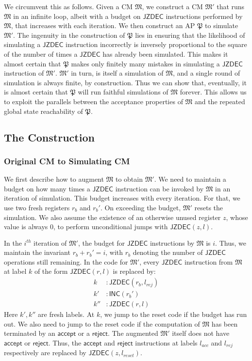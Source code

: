 \documentclass{article}
\theoremstyle{remark}
\newcommand{\program}{\mathfrak{P}}
\newcommand{\machine}{\mathfrak{M}}
\newcommand{\inc}{\mathsf{INC}}
\newcommand{\jzdec}{\mathsf{JZDEC}}
\newcommand{\accept}{\mathsf{accept}}
\newcommand{\reject}{\mathsf{reject}}
\begin{document}
We circumvent this as follows. Given a CM $\machine$, we construct a CM $\machine'$ that runs $\machine$ in an infinite loop, albeit with a budget on $\jzdec$ instructions performed by $\machine$, that increases with each iteration. We then construct an AP $\program$ to simulate $\machine'$. The ingenuity in the construction of $\program$ lies in ensuring that the likelihood of simulating a $\jzdec$ instruction incorrectly is inversely proportional to the square of the number of times a $\jzdec$ has already been simulated. This makes it almost certain that $\program$ makes only finitely many mistakes in simulating a $\jzdec$ instruction of $\machine'$. $\machine'$ in turn, is itself a simulation of $\machine$, and a single round of simulation is always finite, by construction. Thus we can show that, eventually, it is almost certain that $\program$ will run faithful simulations of $\machine$ forever. This allows us to exploit the parallels between the acceptance properties of $\machine$ and the repeated global state reachability of $\program$.

\subsection{The Construction}
\subsubsection{Original CM to Simulating CM}
We first describe how to augment $\machine$ to obtain $\machine'$. We need to maintain a budget on how many times a $\jzdec$ instruction can be invoked by $\machine$ in an iteration of simulation. This budget increases with every iteration. For that, we use two fresh registers $r_b$ and $r_b'$. On exceeding the budget, $\machine'$ resets the simulation. We also assume the existence of an otherwise unused register $z$, whose value is always $0$, to perform unconditional jumps with $\jzdec(z, l)$.

In the $i^{th}$ iteration of $\machine'$, the budget for $\jzdec$ instructions by $\machine$ is $i$. Thus, we maintain the invariant $r_b + r_b' = i$, with $r_b$ denoting the number of $\jzdec$ operations still remaining. In the code for $\machine'$, every $\jzdec$ instruction from $\machine$ at label $k$ of the form $\jzdec(r, l)$ is replaced by:
\begin{align*}
k &: \jzdec(r_b, l_{rej}) \\
k' &: \inc(r_b') \\
k'' &: \jzdec(r, l)
\end{align*} 
Here $k', k''$ are fresh labels. At $k$, we jump to the reset code if the budget has run out. We also need to jump to the reset code if the computation of $\machine$ has been terminated by an $\accept$ or a $\reject$. The augmented $\machine'$ itself does not have $\accept$ or $\reject$. Thus, the $\accept$ and $\reject$ instructions at labels $l_{acc}$ and $l_{rej}$ respectively are replaced by $\jzdec(z, l_{reset})$.
\end{document}

